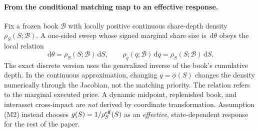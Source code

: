 \documentclass[11pt]{article}
\numberwithin{equation}{section}
\theoremstyle{definition}
\theoremstyle{remark}
\newcommand{\dd}{\,\mathrm{d}}
\begin{document}
\paragraph{From the conditional matching map to an effective response.} Fix a frozen book $\mathcal B$ with locally positive continuous share-depth density $\rho_S(S;\mathcal B)$. A one-sided sweep whose signed marginal share size is $\dd\theta$ obeys the local relation
\begin{equation}\label{eq:frozen-depth}
\dd\theta=\rho_S(S;\mathcal B)\dd S,
\qquad \rho_q(q;\mathcal B)\dd q=\rho_S(S;\mathcal B)\dd S.
\end{equation}
The exact discrete version uses the generalized inverse of the book's cumulative depth. In the continuous approximation, changing $q=\phi(S)$ changes the density numerically through the Jacobian, not the matching priority. The relation refers to the marginal executed price. A dynamic midpoint, replenished book, and interasset cross-impact are \emph{not} derived by coordinate transformation. Assumption (M2) instead chooses $g(S)=1/\rho_S^{\rm eff}(S)$ as an \emph{effective}, state-dependent response for the rest of the paper.
\end{document}
